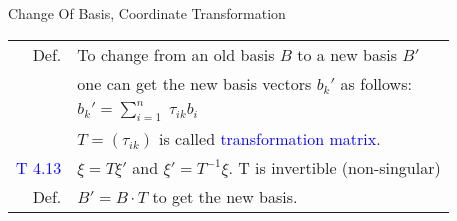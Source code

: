 \begin{mainbox}{Change Of Basis, Coordinate Transformation}
\setlength{\tabcolsep}{2pt}
\begin{tabular}{rl}
	Def. & To change from an old basis $B$ to a new basis $B'$\\
	& one can get the new basis vectors $b_k'$ as follows:\\
	& $b_k' = \displaystyle\sum_{i=1}^n\;\tau_{ik}b_i$\\
	& $T = (\tau_{ik})$ is called \textcolor{blue}{transformation matrix}.\\
	\rule{0pt}{3ex}
	\textcolor{blue}{T 4.13} & $\xi = T\xi'$ and $\xi' = T^{-1}\xi$. T is invertible (non-singular)\\
	\rule{0pt}{3ex}
	Def. & $B' = B\cdot T$ to get the new basis.\\
\end{tabular}
\end{mainbox}
